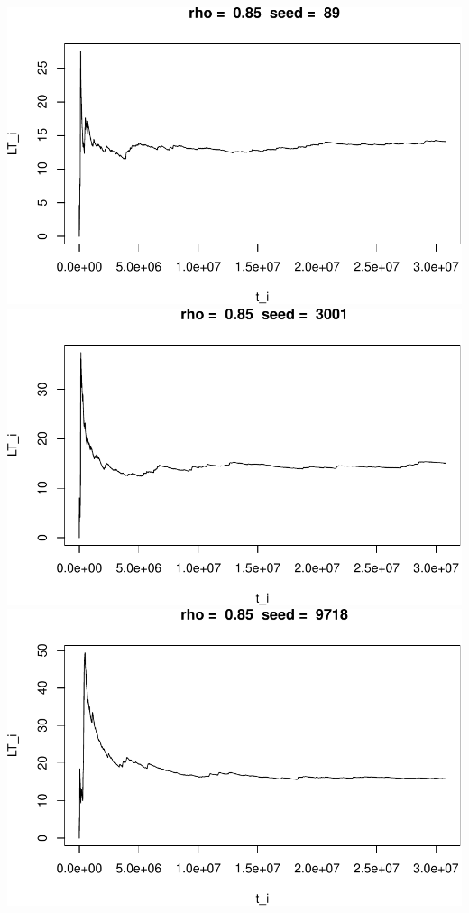 \documentclass[]{article}
\begin{document}
\includegraphics{003_files/figure-latex/unnamed-chunk-20-7.pdf}
\includegraphics{003_files/figure-latex/unnamed-chunk-20-8.pdf}
\includegraphics{003_files/figure-latex/unnamed-chunk-20-9.pdf}
\end{document}
